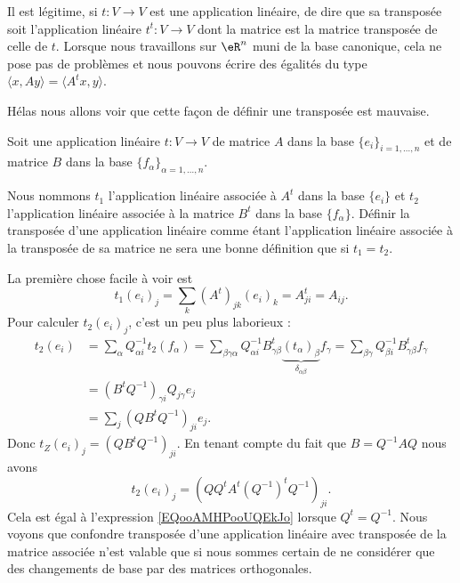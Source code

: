 Il est légitime, si \( t\colon V\to V\) est une application linéaire, de dire que sa transposée soit l'application linéaire \( t^t\colon V\to V\) dont la matrice est la matrice transposée de celle de \( t\). Lorsque nous travaillons sur \( \eR^n\) muni de la base canonique, cela ne pose pas de problèmes et nous pouvons écrire des égalités du type \( \langle x, Ay\rangle =\langle A^tx, y\rangle \).

Hélas nous allons voir que cette façon de définir une transposée est mauvaise. 

Soit une application linéaire \( t\colon V\to V\) de matrice \( A\) dans la base \( \{ e_i \}_{i=1,\ldots, n}\) et de matrice \( B\) dans la base \( \{ f_{\alpha} \}_{\alpha=1,\ldots, n}\).

Nous nommons \( t_1\) l'application linéaire associée à \( A^t\) dans la base \( \{ e_i \}\) et \( t_2\) l'application linéaire associée à la matrice \( B^t\) dans la base \( \{ f_{\alpha} \}\). Définir la transposée d'une application linéaire comme étant l'application linéaire associée à la transposée de sa matrice ne sera une bonne définition que si \( t_1=t_2\).

La première chose facile à voir est
\begin{equation}        \label{EQooAMHPooUQEkJo}
    t_1(e_i)_j=\sum_k(A^t)_{jk}(e_i)_k=A^t_{ji}=A_{ij}.
\end{equation}
Pour calculer \( t_2(e_i)_j\), c'est un peu plus laborieux :
\begin{subequations}
    \begin{align}
        t_2(e_i)&=\sum_{\alpha}Q_{\alpha i}^{-1} t_2(f_\alpha)=\sum_{\beta\gamma\alpha}Q_{\alpha i}^{-1}B^t_{\gamma\beta}\underbrace{(t_{\alpha})_{\beta}}_{\delta_{\alpha\beta}}f_{\gamma}=\sum_{\beta\gamma}Q_{\beta i}^{-1}B^t_{\gamma\beta}f_{\gamma}\\
        &=(B^tQ^{-1})_{\gamma i}Q_{j\gamma}e_j\\
        &=\sum_j(QB^tQ^{-1})_{ji}e_j.
    \end{align}
\end{subequations}
Donc \( t_Z(e_i)_j=(QB^tQ^{-1})_{ji}\). En tenant compte du fait que \( B=Q^{-1}AQ\) nous avons
\begin{equation}
    t_2(e_i)_j=(QQ^tA^t(Q^{-1})^tQ^{-1})_{ji}.
\end{equation}
Cela est égal à l'expression \eqref{EQooAMHPooUQEkJo} lorsque \( Q^t=Q^{-1}\). Nous voyons que confondre transposée d'une application linéaire avec transposée de la matrice associée n'est valable que si nous sommes certain de ne considérer que des changements de base par des matrices orthogonales.

